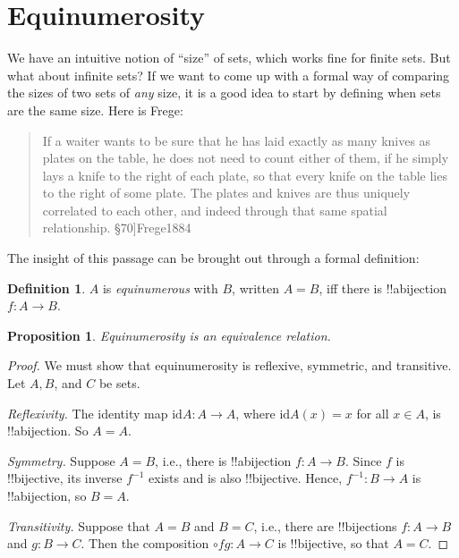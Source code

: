 \documentclass[10pt,a4paper]{article}
\theoremstyle{plain}
\newtheorem{prop}[thm]{Proposition}
\theoremstyle{definition}
\newtheorem{defn}[thm]{Definition}
\theoremstyle{remark}
\newcommand*{\olfileid}[3]{}
\newcommand*{\olsection}[1]{\section*{#1}}
\newcommand*{\ollabel}[1]{\label{#1}}
\providecommand{\Id}{\mathrm{id}}
\providecommand{\comp}{\circ}
\providecommand{\citep}[1]{\cite{#1}}
\providecommand{\cardeq}[2]{#1 = #2}
\begin{document}



\olfileid{sfr}{siz}{equ}

\olsection{Equinumerosity}

We have an intuitive notion of ``size'' of sets, which works fine for
finite sets. But what about infinite sets? If we want to come up with
a formal way of comparing the sizes of two sets of \emph{any} size, it
is a good idea to start by defining when sets are the same size. Here
is Frege:
\begin{quote}
  If a waiter wants to be sure that he has laid exactly as many knives
  as plates on the table, he does not need to count either of them, if
  he simply lays a knife to the right of each plate, so that every
  knife on the table lies to the right of some plate. The plates and
  knives are thus uniquely correlated to each other, and indeed
  through that same spatial relationship. \citep[\S70]{Frege1884}
\end{quote}
The insight of this passage can be brought out through a formal
definition:

\begin{defn}\ollabel{comparisondef}
  $A$ is \emph{equinumerous} with $B$, written $\cardeq{A}{B}$, iff
  there is !!a{bijection} $f \colon A \to B$. 
\end{defn}

\begin{prop}\ollabel{equinumerosityisequi}
Equinumerosity is an equivalence relation.
\end{prop}

\begin{proof} 
We must show that equinumerosity is reflexive, symmetric, and
transitive. Let $A, B$, and $C$ be sets.

\emph{Reflexivity.} The identity map $\Id{A} \colon A \to A$, where
$\Id{A} (x) = x$ for all $x \in A$, is !!a{bijection}. So
$\cardeq{A}{A}$.

\emph{Symmetry.} Suppose $\cardeq{A}{B}$, i.e., there is
!!a{bijection} $f\colon A \to B$. Since $f$ is !!{bijective}, its
inverse $f^{-1}$ exists and is also !!{bijective}. Hence,
$f^{-1}\colon B \to A$ is !!a{bijection}, so $\cardeq{B}{A}$.

\emph{Transitivity.} Suppose that $\cardeq{A}{B}$ and $\cardeq{B}{C}$,
i.e., there are !!{bijection}s $f\colon A \to B$ and $g\colon B \to
C$. Then the composition $\comp{f}{g}\colon A \to C$ is !!{bijective},
so that $\cardeq{A}{C}$.
\end{proof}
\end{document}
